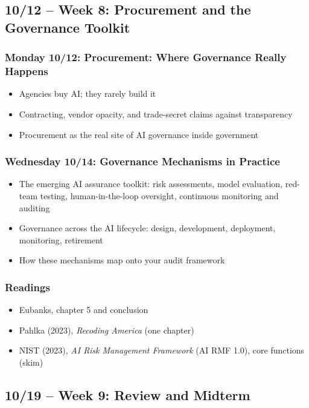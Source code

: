 \documentclass[12pt]{article}
\begin{document}
\subsection*{10/12 -- Week 8: Procurement and the Governance Toolkit}
    \subsubsection*{Monday 10/12: Procurement: Where Governance Really Happens}
        \begin{itemize}
            \item Agencies buy AI; they rarely build it
            \item Contracting, vendor opacity, and trade-secret claims against transparency
            \item Procurement as the real site of AI governance inside government
        \end{itemize}
    \subsubsection*{Wednesday 10/14: Governance Mechanisms in Practice}
        \begin{itemize}
            \item The emerging AI assurance toolkit: risk assessments, model evaluation, red-team testing, human-in-the-loop oversight, continuous monitoring and auditing
            \item Governance across the AI lifecycle: design, development, deployment, monitoring, retirement
            \item How these mechanisms map onto your audit framework
        \end{itemize}
    \subsubsection*{Readings}
        \begin{itemize}
            \item Eubanks, chapter 5 and conclusion
            \item Pahlka (2023), \emph{Recoding America} (one chapter)
            \item NIST (2023), \emph{AI Risk Management Framework} (AI RMF 1.0), core functions (skim)
        \end{itemize}

\subsection*{10/19 -- Week 9: Review and Midterm}
\end{document}
